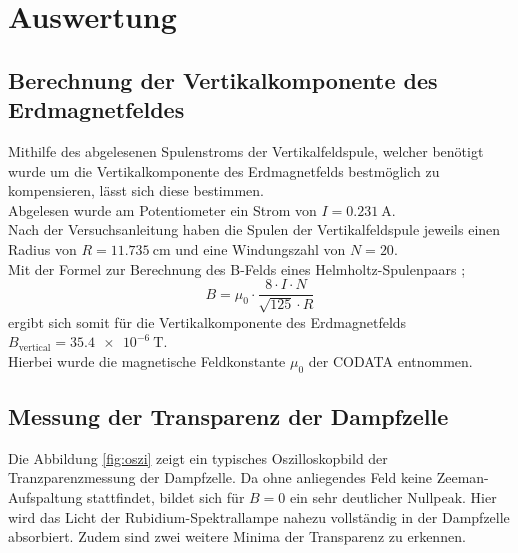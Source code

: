 \section{Auswertung}
\label{sec:Auswertung}
\subsection{Berechnung der Vertikalkomponente des Erdmagnetfeldes}
Mithilfe des abgelesenen Spulenstroms der Vertikalfeldspule, welcher benötigt wurde um die Vertikalkomponente des Erdmagnetfelds bestmöglich zu kompensieren, lässt sich diese bestimmen.\\
Abgelesen wurde am Potentiometer ein Strom von $I=\SI{0.231}{\ampere}$.\\
Nach der Versuchsanleitung \cite{Anleitung} haben die Spulen der Vertikalfeldspule jeweils einen Radius von $R=\SI{11.735}{\centi\meter}$ und eine Windungszahl von $N=20$.\\
Mit der Formel zur Berechnung des B-Felds eines Helmholtz-Spulenpaars \cite{demtröder};
\begin{equation}
\label{eqn:hholtz}
B=\mu_{\mathrm{0}} \cdot \frac{8\cdot I \cdot N}{\sqrt{125}\cdot R}
\end{equation}
ergibt sich somit für die Vertikalkomponente des Erdmagnetfelds $B_{\mathrm{vertical}}=\SI{35.4e-6}{\tesla}$.\\
Hierbei wurde die magnetische Feldkonstante $\mu_{0}$ der CODATA entnommen. \cite{mu_0}

\subsection{Messung der Transparenz der Dampfzelle}
Die Abbildung \ref{fig:oszi} zeigt ein typisches Oszilloskopbild der Tranzparenzmessung der Dampfzelle.
Da ohne anliegendes Feld keine Zeeman-Aufspaltung stattfindet, bildet sich für $B=0$ ein sehr deutlicher Nullpeak.
Hier wird das Licht der Rubidium-Spektrallampe nahezu vollständig in der Dampfzelle absorbiert. Zudem sind zwei weitere Minima der Transparenz zu erkennen.

